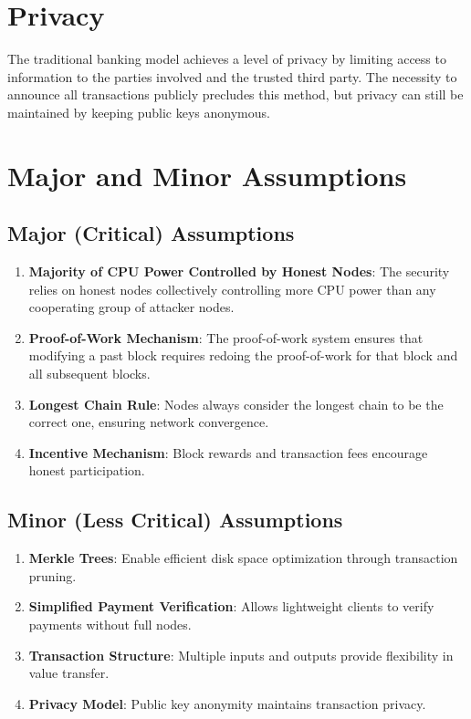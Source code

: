 \documentclass{article}
\begin{document}
\section{Privacy}

The traditional banking model achieves a level of privacy by limiting access to information to the parties involved and the trusted third party. The necessity to announce all transactions publicly precludes this method, but privacy can still be maintained by keeping public keys anonymous.

\section{Major and Minor Assumptions}

\subsection{Major (Critical) Assumptions}

\begin{enumerate}
\item \textbf{Majority of CPU Power Controlled by Honest Nodes}: The security relies on honest nodes collectively controlling more CPU power than any cooperating group of attacker nodes.

\item \textbf{Proof-of-Work Mechanism}: The proof-of-work system ensures that modifying a past block requires redoing the proof-of-work for that block and all subsequent blocks.

\item \textbf{Longest Chain Rule}: Nodes always consider the longest chain to be the correct one, ensuring network convergence.

\item \textbf{Incentive Mechanism}: Block rewards and transaction fees encourage honest participation.
\end{enumerate}

\subsection{Minor (Less Critical) Assumptions}

\begin{enumerate}
\item \textbf{Merkle Trees}: Enable efficient disk space optimization through transaction pruning.

\item \textbf{Simplified Payment Verification}: Allows lightweight clients to verify payments without full nodes.

\item \textbf{Transaction Structure}: Multiple inputs and outputs provide flexibility in value transfer.

\item \textbf{Privacy Model}: Public key anonymity maintains transaction privacy.
\end{enumerate}
\end{document}
